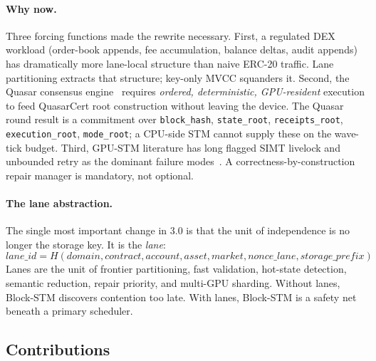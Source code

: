 \paragraph{Why now.}
Three forcing functions made the rewrite necessary.
First, a regulated DEX workload (order-book appends, fee accumulation,
balance deltas, audit appends) has dramatically more lane-local
structure than naive ERC-20 traffic. Lane partitioning extracts that
structure; key-only MVCC squanders it.
Second, the Quasar consensus engine~\cite{quasar2025} requires
\emph{ordered, deterministic, GPU-resident} execution to feed
QuasarCert root construction without leaving the device. The Quasar
round result is a commitment over \texttt{block\_hash},
\texttt{state\_root}, \texttt{receipts\_root}, \texttt{execution\_root},
\texttt{mode\_root}; a CPU-side STM cannot supply these on the wave-tick
budget.
Third, GPU-STM literature has long flagged SIMT livelock and unbounded
retry as the dominant failure modes~\cite{cederman2010,holey2014}. A
correctness-by-construction repair manager is mandatory, not optional.

\paragraph{The lane abstraction.}
The single most important change in 3.0 is that the unit of independence
is no longer the storage key. It is the \emph{lane}:
\[
\mathit{lane\_id} = H(\mathit{domain}, \mathit{contract},
\mathit{account}, \mathit{asset}, \mathit{market}, \mathit{nonce\_lane},
\mathit{storage\_prefix})
\]
Lanes are the unit of frontier partitioning, fast validation,
hot-state detection, semantic reduction, repair priority, and multi-GPU
sharding. Without lanes, Block-STM discovers contention too late.
With lanes, Block-STM is a safety net beneath a primary scheduler.

\subsection{Contributions}


